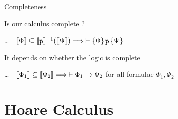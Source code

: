 \documentclass{beamer}
\begin{document}
\begin{frame}{Completeness}

        Is our calculus complete ?

        \dots \, \ie\  $\llbracket \Phi \rrbracket \subseteq \llbracket \mathtt{p} \rrbracket^{-1}(\llbracket \Psi \rrbracket) \Longrightarrow
        \> 
        \vdash \{ \Phi \} \, \mathtt{p} \, \{ \Psi \}$

        \pause
        \bigskip
        \bigskip
        It depends on whether the logic is complete

        \dots \, \ie\ $\llbracket \Phi_1 \rrbracket \subseteq \llbracket \Phi_2 \rrbracket \Longrightarrow \> \vdash \Phi_1 \rightarrow \Phi_2$
        for all formulae $\Phi_1, \Phi_2$

\end{frame}
\section{Hoare Calculus}



\end{document}
